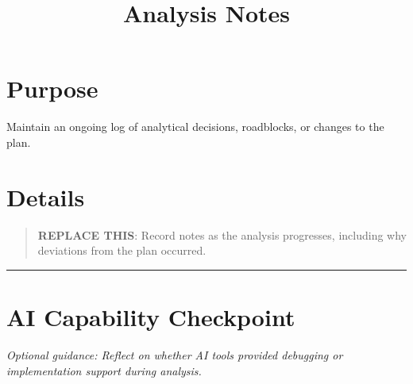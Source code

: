 \documentclass[
]{report}
\title{Analysis Notes}
\author{}
\date{}
\renewcommand*\contentsname{Table of contents}
\newcommand\contentsname{Table of contents}
\begin{document}
\maketitle

\renewcommand*\contentsname{Table of contents}
{
\hypersetup{linkcolor=}
\setcounter{tocdepth}{2}
\tableofcontents
}

\chapter{Purpose}\label{purpose}

Maintain an ongoing log of analytical decisions, roadblocks, or changes
to the plan.

\chapter{Details}\label{details}

\begin{quote}
\textbf{REPLACE THIS}: Record notes as the analysis progresses,
including why deviations from the plan occurred.
\end{quote}

\begin{center}\rule{0.5\linewidth}{0.5pt}\end{center}

\chapter{AI Capability Checkpoint}\label{ai-capability-checkpoint}

\emph{Optional guidance: Reflect on whether AI tools provided debugging
or implementation support during analysis.}
\end{document}

